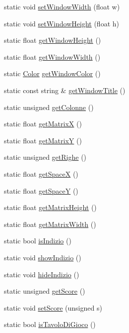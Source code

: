 \begin{DoxyCompactItemize}
\item 
static void \hyperlink{class_global_values_abb35dfba6d3c15563308a76186e0cce1}{set\+Window\+Width} (float w)
\item 
static void \hyperlink{class_global_values_aace63d43ed8917e3c96a90b9d703a474}{set\+Window\+Height} (float h)
\item 
static float \hyperlink{class_global_values_af40b90ec655cadffce663e011b4bde45}{get\+Window\+Height} ()
\item 
static float \hyperlink{class_global_values_a252eb890189d2f19cb44200523fad440}{get\+Window\+Width} ()
\item 
static \hyperlink{struct_color}{Color} \hyperlink{class_global_values_aa1d8542a6a0b370669902199ae89c7d3}{get\+Window\+Color} ()
\item 
static const string \& \hyperlink{class_global_values_aa7e0d10bacf8d0309a8c43098419baae}{get\+Window\+Title} ()
\item 
static unsigned \hyperlink{class_global_values_a80a265f238b3861da7075770cc2dcb3e}{get\+Colonne} ()
\item 
static float \hyperlink{class_global_values_a1305db5c3c8dc85384f7792f9fa3665d}{get\+MatrixX} ()
\item 
static float \hyperlink{class_global_values_abdf8c3dd80b6950cc82d0f2b2414bd81}{get\+MatrixY} ()
\item 
static unsigned \hyperlink{class_global_values_af7537a042a80f39285802564594be80b}{get\+Righe} ()
\item 
static float \hyperlink{class_global_values_ac46053e4753d7eaf844623202f21fb3b}{get\+SpaceX} ()
\item 
static float \hyperlink{class_global_values_a12285e65138f9ff5679655ee17285156}{get\+SpaceY} ()
\item 
static float \hyperlink{class_global_values_a14c43d59d68d43ed3081b98641b8f47c}{get\+Matrix\+Height} ()
\item 
static float \hyperlink{class_global_values_a618c0e7f3246edd2a8385c51f2692258}{get\+Matrix\+Width} ()
\item 
static bool \hyperlink{class_global_values_ac07ccab83df3c844556fc8a57b27af02}{is\+Indizio} ()
\item 
static void \hyperlink{class_global_values_a783f8c7c90b16f968a81f5bac4146959}{show\+Indizio} ()
\item 
static void \hyperlink{class_global_values_ad7a083c6a7fddf9c7b81b9bfcc045dbf}{hide\+Indizio} ()
\item 
static unsigned \hyperlink{class_global_values_a9161bb57c2d284956356aee1d9d73970}{get\+Score} ()
\item 
static void \hyperlink{class_global_values_a11410069107ba5cbd3bd96d549e6d630}{set\+Score} (unsigned s)
\item 
static bool \hyperlink{class_global_values_ad37f4ef2cc7e6f3ecd2e8f504a5ffecb}{is\+Tavolo\+Di\+Gioco} ()
\end{DoxyCompactItemize}


